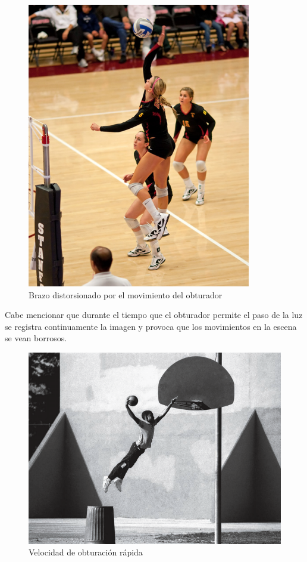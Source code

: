 \documentclass{article}
\begin{document}
\begin{figure}[H]
	\centering
	\includegraphics[width=0.85\linewidth]{Figuras/Rolling_Shutter_Volleyball}
	\caption{Brazo distorsionado por el movimiento del obturador}
	\label{fig:rollingshuttervolleyball}
\end{figure}

Cabe mencionar que durante el tiempo que el obturador permite el paso de la luz se registra continuamente la imagen y provoca que los movimientos en la escena se vean borrosos.

\begin{figure}[H]
	\centering
	\includegraphics[width=0.85\linewidth]{Figuras/Shutter_Speed_4}
	\caption{Velocidad de obturación rápida}
	\label{fig:shutterspeed1}
\end{figure}
\end{document}
